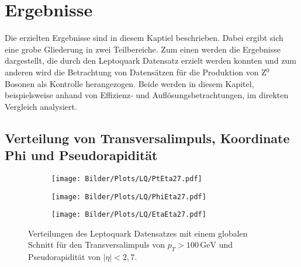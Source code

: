 \chapter{Ergebnisse}\label{Ergebnisse}%
Die erzielten Ergebnisse sind in diesem Kaptiel beschrieben. Dabei ergibt sich eine grobe Gliederung in zwei Teilbereiche. Zum einen werden die Ergebnisse dargestellt, die durch den Leptoquark Datensatz erzielt werden konnten und zum anderen wird die Betrachtung von Datensätzen für die Produktion von Z$^0$ Bosonen als Kontrolle herangezogen. Beide werden in diesem Kapitel, beispielsweise anhand von Effizienz- und Auflösungsbetrachtungen, im direkten Vergleich analysiert. 
\section{Verteilung von Transversalimpuls, Koordinate Phi und Pseudorapidität}%
\begin{figure}
  \begin{subfigure}[t]{0.55\textwidth}
  \texttt{[image: Bilder/Plots/LQ/PtEta27.pdf]}
  \label{PtEta27}
  \end{subfigure}
\begin{subfigure}[t]{0.55\textwidth}
 \texttt{[image: Bilder/Plots/LQ/PhiEta27.pdf]}
  \label{PhiEta27}
\end{subfigure}
\begin{subfigure}[t]{0.55\textwidth}
  \texttt{[image: Bilder/Plots/LQ/EtaEta27.pdf]}
  \label{EtaEta27}
\end{subfigure}
\caption[Verteilungen des Leptoquark Datensatzes]{Verteilungen des Leptoquark Datensatzes mit einem globalen Schnitt für den Transversalimpuls von \mbox{$p_T>100\,\text{GeV}$} und Pseudorapidität von $|\eta|<2,7$.}
\label{PtEtaPhi}
\end{figure}
